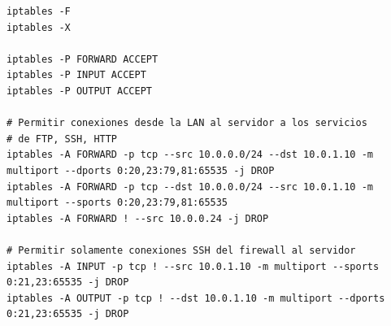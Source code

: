 \begingroup
    \fontsize{9pt}{10pt}\selectfont
\begin{lstlisting}[breaklines=true]
iptables -F
iptables -X

iptables -P FORWARD ACCEPT
iptables -P INPUT ACCEPT
iptables -P OUTPUT ACCEPT

# Permitir conexiones desde la LAN al servidor a los servicios
# de FTP, SSH, HTTP
iptables -A FORWARD -p tcp --src 10.0.0.0/24 --dst 10.0.1.10 -m multiport --dports 0:20,23:79,81:65535 -j DROP
iptables -A FORWARD -p tcp --dst 10.0.0.0/24 --src 10.0.1.10 -m multiport --sports 0:20,23:79,81:65535 
iptables -A FORWARD ! --src 10.0.0.24 -j DROP

# Permitir solamente conexiones SSH del firewall al servidor
iptables -A INPUT -p tcp ! --src 10.0.1.10 -m multiport --sports 0:21,23:65535 -j DROP
iptables -A OUTPUT -p tcp ! --dst 10.0.1.10 -m multiport --dports 0:21,23:65535 -j DROP

\end{lstlisting}
\endgroup

\newpage
\printbibliography









